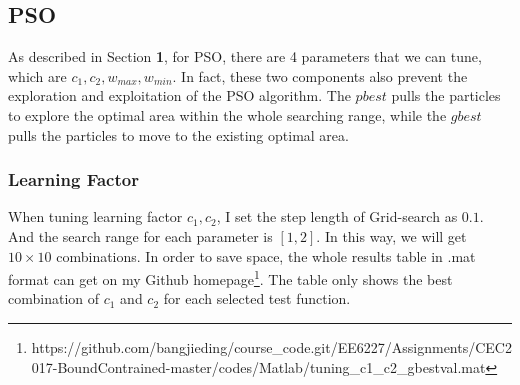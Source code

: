 \documentclass[letterpaper,12pt]{article}
\begin{document}
\subsection{PSO} As described in Section \textbf{1}, for PSO, there are 4 parameters that we can tune, which are $c_1, c_2, w_{max}, w_{min}$.  In fact, these two components also prevent the exploration and exploitation of the PSO algorithm. The $pbest$ pulls the particles to explore the optimal area within the whole searching range, while the $gbest$ pulls the particles to move to the existing optimal area. 
\subsubsection{Learning Factor}
\par When tuning learning factor $c_1, c_2$, I set the step length of Grid-search as $0.1$. And the search range for each parameter is $[1,2]$. In this way, we will get $10\times10$ combinations. In order to save space, the whole results table in .mat format can get on my Github homepage\footnote{https://github.com/bangjieding/course\_code.git/EE6227/Assignments/CEC2017-BoundContrained-master/codes/Matlab/tuning\_c1\_c2\_gbestval.mat}. The table only shows the best combination of $c_1$ and $c_2$ for each selected test function.
\end{document}
